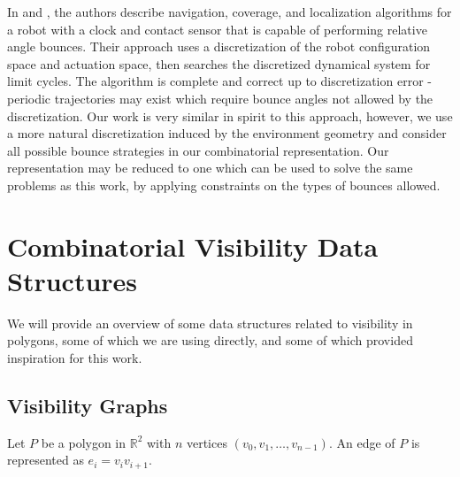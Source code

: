 \documentclass[letterpaper, 10 pt, conference]{ieeeconf}  %
\begin{document}
In \cite{alam2017minimalist} and \cite{alam2018space}, the authors describe navigation, coverage, and localization algorithms for a robot with a clock and contact sensor that is capable of performing relative angle bounces. Their approach uses a discretization of the robot configuration space and actuation space, then searches the discretized dynamical system for limit cycles. The algorithm is complete and correct up to discretization error - periodic trajectories may exist which require bounce angles not allowed by the discretization. Our work is very similar in spirit to this approach, however, we use a more natural discretization induced by the environment geometry and consider all possible bounce strategies in our combinatorial representation. Our representation may be reduced to one which can be used to solve the same problems as this work, by applying constraints on the types of bounces allowed.



\section{Combinatorial Visibility Data Structures}

We will provide an overview of some data structures related to visibility in polygons, some of which we are using directly, and some of which provided inspiration for this work.

\subsection{Visibility Graphs}


Let $P$ be a polygon in $\mathbb{R}^2$ with $n$ vertices $(v_0, v_1, \ldots, v_{n-1})$. An edge of $P$ is represented as $e_i = v_iv_{i+1}$. 
\end{document}
